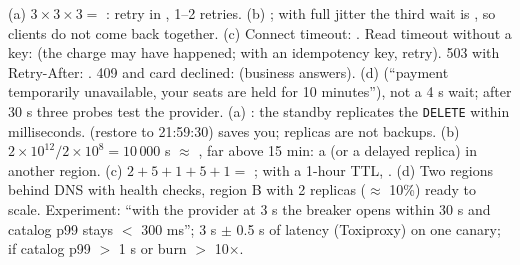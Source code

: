  (a) $3 \times 3 \times 3 =$ : retry in , 1--2 retries. (b) ; with full jitter the third wait is , so clients do not come back together. (c) Connect timeout: . Read timeout without a key:  (the charge may have happened; with an idempotency key, retry). 503 with Retry-After: . 409 and card declined:  (business answers). (d)  (``payment temporarily unavailable, your seats are held for 10 minutes''), not a 4 s wait; after 30 s three probes test the provider.
 (a) : the standby replicates the \texttt{DELETE} within milliseconds.  (restore to 21:59:30) saves you; replicas are not backups. (b) $2 \times 10^{12}/2 \times 10^8 = 10\,000$ s $\approx$ , far above 15 min: a  (or a delayed replica) in another region. (c) $2 + 5 + 1 + 5 + 1 =$ ; with a 1-hour TTL, . (d) Two regions behind DNS with health checks, region B with 2 replicas ($\approx$ 10\%) ready to scale. Experiment:  ``with the provider at 3 s the breaker opens within 30 s and catalog p99 stays $<$ 300 ms'';  3 s $\pm$ 0.5 s of latency (Toxiproxy) on one canary;  if catalog p99 $>$ 1 s or burn $>$ 10$\times$.
